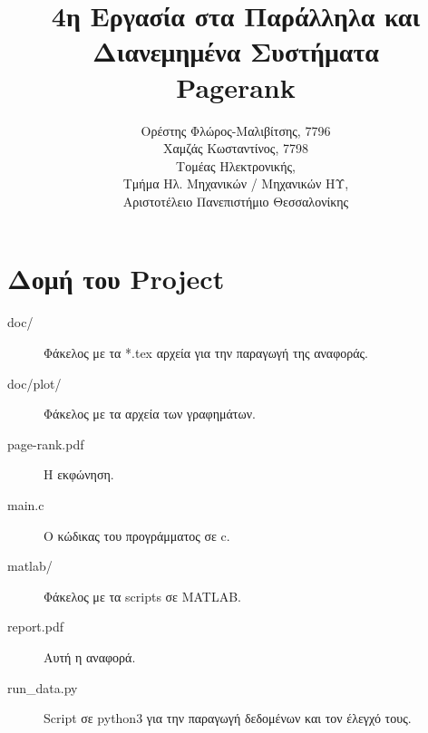 
\usepackage{fontspec}
\setmainfont{DejaVu Serif}
\renewcommand{\contentsname}{Περιεχόμενα}
\renewcommand{\listfigurename}{Λίστα Σχημάτων}
\renewcommand{\figurename}{Σχήμα}
\renewcommand{\lstlistingname}{Καταχώρηση}
\renewcommand{\lstlistlistingname}{List of \lstlistingname s}

\title{4η Εργασία στα Παράλληλα και Διανεμημένα Συστήματα\\Pagerank}
\author{Ορέστης Φλώρος-Μαλιβίτσης, 7796\\
  Χαμζάς Κωσταντίνος, 7798\\
  Τομέας Ηλεκτρονικής,\\
  Τμήμα Ηλ. Μηχανικών / Μηχανικών ΗΥ,\\
  Αριστοτέλειο Πανεπιστήμιο Θεσσαλονίκης}


\maketitle
\tableofcontents
\newpage

\chapter*{Δομή του Project} \label{project-structure}

\begin{description}
	\item[doc/] Φάκελος με τα *.tex αρχεία για την παραγωγή της αναφοράς.
	\item[doc/plot/] Φάκελος με τα αρχεία των γραφημάτων.
	\item[page-rank.pdf] Η εκφώνηση.
	\item[main.c] Ο κώδικας του προγράμματος σε c.
	\item[matlab/] Φάκελος με τα scripts σε MATLAB.
	\item[report.pdf] Αυτή η αναφορά.
	\item[run\_data.py] Script σε python3 για την παραγωγή δεδομένων και τον έλεγχό τους.
\end{description}






